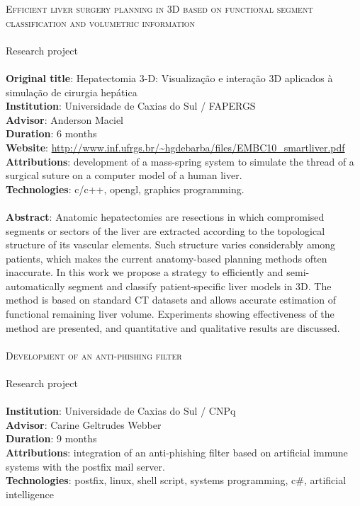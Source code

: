 \noindent
\textsc
    {\Large Efficient liver surgery planning in 3D based on functional segment
    classification and volumetric information} \\\\
Research project \\\\
\textbf{Original title}:
    Hepatectomia 3-D: Visualização e interação 3D aplicados à simulação
    de cirurgia hepática \\
\textbf{Institution}: Universidade de Caxias do Sul / FAPERGS \\
\textbf{Advisor}: Anderson Maciel \\
\textbf{Duration}: 6 months \\
\textbf{Website}:
    \url{http://www.inf.ufrgs.br/~hgdebarba/files/EMBC10_smartliver.pdf} \\
\textbf{Attributions}:
    development of a mass-spring system to simulate the thread of a surgical
    suture on a computer model of a human liver.  \\
\textbf{Technologies}: c/c++, opengl, graphics programming. \\\\
\textbf{Abstract}:
    Anatomic hepatectomies are resections in which compromised segments or
    sectors of the liver are extracted according to the topological structure
    of its vascular elements. Such structure varies considerably among
    patients, which makes the current anatomy-based planning methods often
    inaccurate. In this work we propose a strategy to efficiently and
    semi-automatically segment and classify patient-specific liver models in
    3D. The method is based on standard CT datasets and allows accurate
    estimation of functional remaining liver volume. Experiments showing
    effectiveness of the method are presented, and quantitative and qualitative
    results are discussed. \\\\

\noindent
\textsc{\Large Development of an anti-phishing filter} \\\\
Research project \\\\
\textbf{Institution}: Universidade de Caxias do Sul / CNPq \\
\textbf{Advisor}: Carine Geltrudes Webber \\
\textbf{Duration}: 9 months \\
\textbf{Attributions}:
    integration of an anti-phishing filter based on artificial immune systems
    with the postfix mail server. \\
\textbf{Technologies}:
    postfix, linux, shell script, systems programming, c\#, artificial
    intelligence \\\\\\
